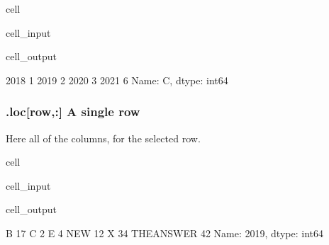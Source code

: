 \documentclass[letterpaper,10pt,english]{jupyterBook}
\begin{document}
\begin{sphinxuseclass}{cell}\begin{sphinxVerbatimInput}

\begin{sphinxuseclass}{cell_input}
\begin{sphinxVerbatim}[commandchars=\\\{\}]
\PYG{p}{[}\PYG{p}{]}
\end{sphinxVerbatim}

\end{sphinxuseclass}\end{sphinxVerbatimInput}
\begin{sphinxVerbatimOutput}

\begin{sphinxuseclass}{cell_output}
\begin{sphinxVerbatim}[commandchars=\\\{\}]
2018    1
2019    2
2020    3
2021    6
Name: C, dtype: int64
\end{sphinxVerbatim}

\end{sphinxuseclass}\end{sphinxVerbatimOutput}

\end{sphinxuseclass}

\subsubsection{.loc{[}row,:{]} A single row}
\label{\detokenize{content/04_PythonEssentials/PythonPackagesEtc:loc-row-a-single-row}}
\sphinxAtStartPar
Here all of the columns, for the selected row.

\begin{sphinxuseclass}{cell}\begin{sphinxVerbatimInput}

\begin{sphinxuseclass}{cell_input}
\begin{sphinxVerbatim}[commandchars=\\\{\}]
\PYG{p}{[}\PYG{p}{]}
\end{sphinxVerbatim}

\end{sphinxuseclass}\end{sphinxVerbatimInput}
\begin{sphinxVerbatimOutput}

\begin{sphinxuseclass}{cell_output}
\begin{sphinxVerbatim}[commandchars=\\\{\}]
B             17
C              2
E              4
NEW           12
X             34
THE\PYGZus{}ANSWER    42
Name: 2019, dtype: int64
\end{sphinxVerbatim}

\end{sphinxuseclass}\end{sphinxVerbatimOutput}

\end{sphinxuseclass}
\end{document}
